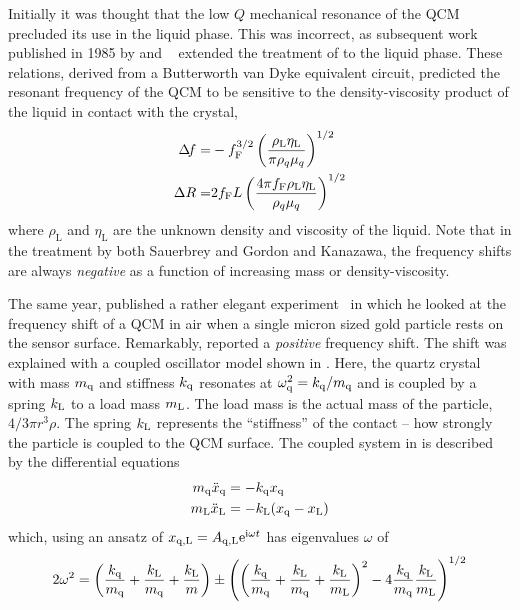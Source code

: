 Initially it was thought that the low $Q$ mechanical resonance of the QCM
precluded its use in the liquid phase.  This was incorrect, as subsequent
work published in 1985 by  and ~\cite{guys} extended the
treatment of  to the liquid phase.  These relations,
derived from a Butterworth van Dyke equivalent circuit, predicted the
resonant frequency of the QCM
to be sensitive to the density-viscosity product of the liquid in contact
with the crystal, 
\begin{align}
\Delta\!f=&-f_{\text{F}}^{3/2}\left(\frac{\rho_{\text{L}}\eta_{\text{L}}}{\pi\rho_{q}\mu_{q}}\right)^{1/2}\\
\Delta R=&2f_{\text{F}}L\left(\frac{4\pi
 f_{\text{F}}\rho_{\text{L}}\eta_{\text{L}}}{\rho_{q}\mu_{q}}\right)^{1/2}
\end{align}
where $\rho_{\text{L}}$ and $\eta_{\text{L}}$ are the unknown density and
viscosity of the liquid.  Note that in the treatment by both Sauerbrey and
Gordon and Kanazawa, the frequency shifts are always \textit{negative} as a
function of increasing mass or density-viscosity.

The same year,  published a rather elegant
experiment~\cite{dybwad} in which he looked at the frequency shift of a QCM
in air when a single micron sized gold particle rests on the sensor
surface.  Remarkably,  reported a \textit{positive}
frequency shift.  The shift was explained with a coupled oscillator model
shown in .
Here, the quartz crystal with mass $m_\mathrm{q}$ and stiffness
$k_\mathrm{q}$ resonates at
$\omega_\mathrm{q}^2=k_\mathrm{q}/m_\mathrm{q}$ and is coupled by a spring
$k_\mathrm{L}$ to a load mass $m_\mathrm{L}$.  The load mass is the actual mass of
the particle, $4/3 \pi r^3 \rho$.  The spring $k_\mathrm{L}$ represents the
``stiffness'' of the contact -- how strongly the particle is coupled to the
QCM surface.  The coupled system in  is described
by the differential equations
\begin{align}
 m_\mathrm{q} \ddot{x}_\mathrm{q} &= -k_\mathrm{q} x_\mathrm{q}\\
 m_\mathrm{L} \ddot{x}_\mathrm{L} &= -k_\mathrm{L} (x_\mathrm{q}-x_\mathrm{L})
\end{align}
which, using an ansatz of
$x_{\mathrm{q},\mathrm{L}}=A_{\mathrm{q},\mathrm{L}}{\mathrm{e}}^{{\mathrm{i}} \omega t}$ has
eigenvalues $\omega$ of
\begin{equation}
 2\omega^{2}=\left(\frac{k_\mathrm{q}}{m_\mathrm{q}}+\frac{k_\mathrm{L}}{m_\mathrm{q}}+\frac{k_\mathrm{L}}{m}\right)\pm\left(\left(\frac{k_\mathrm{q}}{m_\mathrm{q}}+\frac{k_\mathrm{L}}{m_\mathrm{q}}+\frac{k_\mathrm{L}}{m_\mathrm{L}}\right)^{2}-4\frac{k_\mathrm{q}}{m_\mathrm{q}}\frac{k_\mathrm{L}}{m_\mathrm{L}}\right)^{1/2}
 \label{eqn:dybwadresult}
\end{equation}

